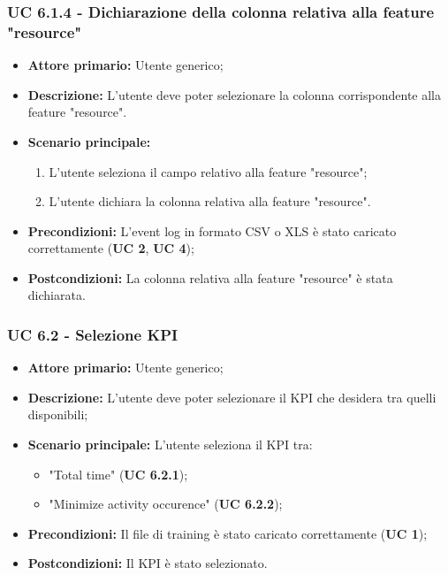 \subsubsection{UC 6.1.4 - Dichiarazione della colonna relativa alla feature "resource"}
\begin{itemize}
	\item \textbf{Attore primario:} Utente generico;
	\item \textbf{Descrizione:} L'utente deve poter selezionare la colonna corrispondente alla feature "resource".
	\item \textbf{Scenario principale:} 
		\begin{enumerate}
			\item L'utente seleziona il campo relativo alla feature "resource";
			\item L'utente dichiara la colonna relativa alla feature "resource".
		\end{enumerate}
	\item \textbf{Precondizioni:}  L'event log in formato CSV o XLS è stato caricato correttamente (\textbf{UC 2}, \textbf{UC 4});
	\item \textbf{Postcondizioni:} La colonna relativa alla feature "resource" è stata dichiarata.
\end{itemize}


\subsubsection{UC 6.2 - Selezione KPI}
\begin{itemize}
	\item \textbf{Attore primario:} Utente generico;
	\item \textbf{Descrizione:} L'utente deve poter selezionare il KPI che desidera tra quelli disponibili;
	\item \textbf{Scenario principale:} L'utente seleziona il KPI tra:
		\begin{itemize}
			\item "Total time" (\textbf{UC 6.2.1});
			\item "Minimize activity occurence" (\textbf{UC 6.2.2});
		\end{itemize}
	\item \textbf{Precondizioni:} Il file di training è stato caricato correttamente (\textbf{UC 1});
	\item \textbf{Postcondizioni:} Il KPI è stato selezionato.
\end{itemize}

